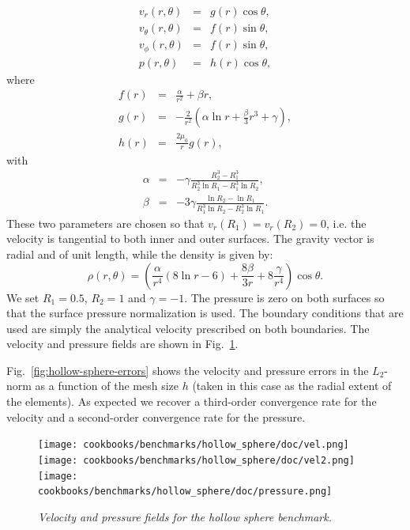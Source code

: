 \documentclass{article}
\begin{document}
\begin{eqnarray}
v_r(r,\theta)      &=& g(r) \cos \theta, \\
v_\theta(r,\theta) &=& f(r) \sin \theta, \\
v_\phi(r,\theta)   &=& f(r) \sin \theta, \\
p(r,\theta)        &=& h(r) \cos \theta ,
\end{eqnarray}
where
\begin{eqnarray}
f(r) &=& \frac{\alpha}{r^2} + \beta r, \\
g(r) &=& -\frac{2}{r^2} \left(  \alpha \ln r + \frac{\beta}{3}  r^3  + \gamma \right),   \\
h(r) &=& \frac{2\mu_0}{r} g(r),
\end{eqnarray}
with
\begin{eqnarray}
\alpha&=&-\gamma \frac{R_2^3-R_1^3}{R_2^3 \ln R_1 - R_1^3 \ln R_2}, \\
\beta &=& -3\gamma \frac{\ln R_2 - \ln R_1  }{R_1^3 \ln R_2 - R_2^3 \ln R_1}.
\end{eqnarray}
These two parameters are chosen so that $v_r(R_1)=v_r(R_2)=0$, i.e.
the velocity is tangential to both inner and outer surfaces.
The gravity vector is radial and of unit length, while the density is given by:
\begin{equation}
\rho(r,\theta)=  \left(   \frac{\alpha}{r^4}  (8 \ln r -6) +  \frac{8\beta}{3r}  +8 \frac{\gamma}{r^4}  \right) \cos\theta.
\end{equation}
We set $R_1=0.5$, $R_2=1$ and $\gamma=-1$. The pressure is zero on both surfaces so that
the surface pressure normalization is used. The boundary conditions that are used are simply
the analytical velocity prescribed on both boundaries.
The velocity and pressure fields are shown in Fig.~\ref{fig:hollow-sphere-vp}.

Fig.~\ref{fig:hollow-sphere-errors} shows the
velocity and pressure errors in the $L_2$-norm as a function of the mesh size $h$ (taken in this case
as the radial extent of the elements). As expected we recover a third-order convergence rate for the velocity
and a second-order convergence rate for the pressure.

\begin{figure}
\centering
\texttt{[image: cookbooks/benchmarks/hollow\_sphere/doc/vel.png]}
\texttt{[image: cookbooks/benchmarks/hollow\_sphere/doc/vel2.png]}
\texttt{[image: cookbooks/benchmarks/hollow\_sphere/doc/pressure.png]}
\caption{\it Velocity and pressure fields for the hollow sphere benchmark.}
\label{fig:hollow-sphere-vp}
\end{figure}
\end{document}
